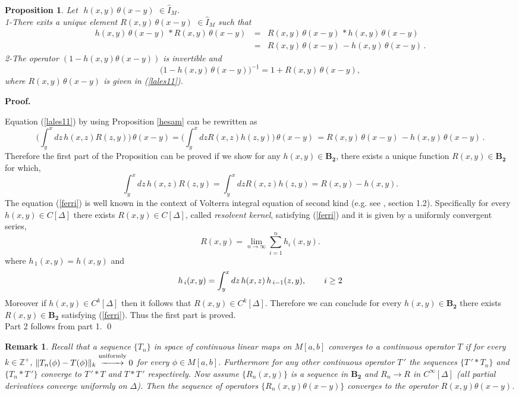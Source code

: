 \documentclass[10pt]{article}
\newcommand{\be}{\begin{equation}}
\newcommand{\ee}{\end{equation}}
\newcommand{\bea}{\begin{eqnarray}}
\newcommand{\eea}{\end{eqnarray}}
\newcommand{\nn}{\nonumber}
\newcommand{\mIm}{\widehat{I}_{M}}
\newtheorem{pro}{Proposition}
\newtheorem{Rema}{Remark}
\begin{document}
\begin{pro}\label{sim1}{Let \,\,$h(x,y)\,{\theta}(x-y)\,\,\in \mIm$.
\\
1-There exits a unique element
 $R(x,y)\,{\theta}(x-y)\,\,\in \mIm$
such that \bea h(x,y)\,{\theta}(x-y)\,*
R(x,y)\,{\theta}(x-y)\,&=&R(x,y)\,{\theta}(x-y)\,*
h(x,y)\,{\theta}(x-y)\,\nn\\&=&
R(x,y)\,{\theta}(x-y)\,-h(x,y)\,{\theta}(x-y)\,.\label{lales11}\eea
2-The operator $(1-h(x,y)\theta(x-y))$ is invertible and
\be\big(1-h(x,y)\,{\theta}(x-y)\big)^{-\underline 1} =
1+R(x,y)\,{\theta}(x-y),\label{ali}\nn\ee where
$R(x,y)\,{\theta}(x-y)$ is given in {\em (\ref{lales11})}}.\end{pro}

{\bf Proof.} {Equation (\ref{lales11}) by using Proposition
\ref{hesam} can be rewritten as \be \Big(\int^{x}_{y} dz \,h(x,z)
R(z,y)\Big)\,{\theta}(x-y)=\Big(\int^{x}_{y} dz R(x,z) h(z,y)
\Big)\,{\theta}(x-y)\,=R(x,y)
\,{\theta}(x-y)\,-h(x,y)\,{\theta}(x-y)\,.\nn\ee Therefore the first
part of the Proposition can be proved if we show for any $h(x,y)\in
\boldsymbol{B_2}$, there exists a unique function
$R(x,y)\in\boldsymbol{B_2}$ for which, \be \int^{x}_{y} dz \,h(x,z)
R(z,y)=\int^{x}_{y} dz R(x,z) h(z,y)=R(x,y)-h(x,y).\label{ferri}\ee
The equation (\ref{ferri}) is well known in the context of Volterra
integral equation of second kind (e.g. see \cite{it}, section 1.2).
Specifically for every $h(x,y)\in C[\Delta]$ there exists $R(x,y)\in
C[\Delta]$, called {\em resolvent kernel}, satisfying (\ref{ferri})
and it is given by a uniformly convergent series, \be
R(x,y)=\lim_{n\to\infty}\sum^{n}_{i=1}h_{i}(x,y).\label{beygi1}\ee
where $h_{\,1}(x,y)=h(x,y)$ and \be h_{\,i}(x,y)=\int^{x}_{y}dz\,
h(x,z) \,h_{\,i-1}(z,y), \hspace{0.75cm}i\ge2\nn\ee Moreover if
$h(x,y)\in C^{k}[\Delta]$ then it follows that $R(x,y)\in
C^{k}[\Delta]$. Therefore we can conclude for every $h(x,y)\in
\boldsymbol{B_2}$ there exists $R(x,y)\in \boldsymbol{B_2}$
satisfying (\ref{ferri}). Thus the first part
is proved.\\
Part 2 follows from part 1. \qed\\

\begin{Rema}\label{zari}{\em {Recall that a sequence $\{T_{n}\}$ in
space of continuous linear maps on $M[a,b]$ converges to a
continuous operator $T$ if for every $k\in{\mathbb Z}^{+}$,
$\|T_{n}(\phi)-T(\phi)\|_{k}\overset{\mathrm{uniformly}}{\xrightarrow{\hspace*{0.75cm}}}0$}
for every $\phi\in M[a,b]$. Furthermore for any other continuous
operator $T{\,'}$ the sequences $\{T{\,'}*T_{n}\}$ and
$\{T_{n}*T{\,'}\}$ converge to $T{\,'}*T$ and $T*T{\,'}$
respectively. Now assume $\{R_{n}(x,y)\}$ is a sequence in
$\boldsymbol{B_2}$ and $R_n\to R$ in $C^{\infty}[\Delta]$ (all
partial derivatives converge uniformly on $\Delta$). Then the
sequence of operators $\{R_{n}(x,y)\theta(x-y)\}$ converges to the
operator $R(x,y)\theta(x-y)$.}\\
\end{Rema}

}
\end{document}
